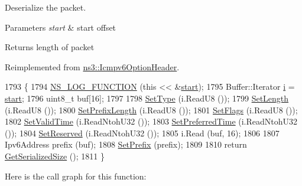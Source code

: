 Deserialize the packet. 


\begin{DoxyParams}{Parameters}
{\em start} & start offset \\
\hline
\end{DoxyParams}
\begin{DoxyReturn}{Returns}
length of packet 
\end{DoxyReturn}


Reimplemented from \hyperlink{classns3_1_1Icmpv6OptionHeader_adb7a895b79c9a492b9b626e1adc40384}{ns3\+::\+Icmpv6\+Option\+Header}.


\begin{DoxyCode}
1793 \{
1794   \hyperlink{log-macros-disabled_8h_a90b90d5bad1f39cb1b64923ea94c0761}{NS\_LOG\_FUNCTION} (\textcolor{keyword}{this} << &\hyperlink{namespacevisualizer_1_1core_a2a35e5d8a34af358b508dac8635754e0}{start});
1795   Buffer::Iterator \hyperlink{bernuolliDistribution_8m_a6f6ccfcf58b31cb6412107d9d5281426}{i} = \hyperlink{namespacevisualizer_1_1core_a2a35e5d8a34af358b508dac8635754e0}{start};
1796   uint8\_t buf[16];
1797 
1798   \hyperlink{classns3_1_1Icmpv6OptionHeader_a05189e19a5b625aeafd808962821a27c}{SetType} (i.ReadU8 ());
1799   \hyperlink{classns3_1_1Icmpv6OptionHeader_ae4a34624523bdfe2355e2ecefa022515}{SetLength} (i.ReadU8 ());
1800   \hyperlink{classns3_1_1Icmpv6OptionPrefixInformation_a8ff2a9422e79f88f79dc430a0740fa4f}{SetPrefixLength} (i.ReadU8 ());
1801   \hyperlink{classns3_1_1Icmpv6OptionPrefixInformation_a76d4d16a225d0a273d1920d37fd24337}{SetFlags} (i.ReadU8 ());
1802   \hyperlink{classns3_1_1Icmpv6OptionPrefixInformation_a347652a0be0124b4fbd167116d0a84f1}{SetValidTime} (i.ReadNtohU32 ());
1803   \hyperlink{classns3_1_1Icmpv6OptionPrefixInformation_ab329e95c80f0d20344ab78d1208e14b8}{SetPreferredTime} (i.ReadNtohU32 ());
1804   \hyperlink{classns3_1_1Icmpv6OptionPrefixInformation_a204f5b5d78296ec975cf6a07b866d756}{SetReserved} (i.ReadNtohU32 ());
1805   i.Read (buf, 16);
1806 
1807   Ipv6Address prefix (buf);
1808   \hyperlink{classns3_1_1Icmpv6OptionPrefixInformation_a3b8d5080ea33c4a9711f1c6caab2b990}{SetPrefix} (prefix);
1809 
1810   \textcolor{keywordflow}{return} \hyperlink{classns3_1_1Icmpv6OptionPrefixInformation_a417e636721bc0ac79b5fea11f8b8e7ea}{GetSerializedSize} ();
1811 \}
\end{DoxyCode}


Here is the call graph for this function\+:


